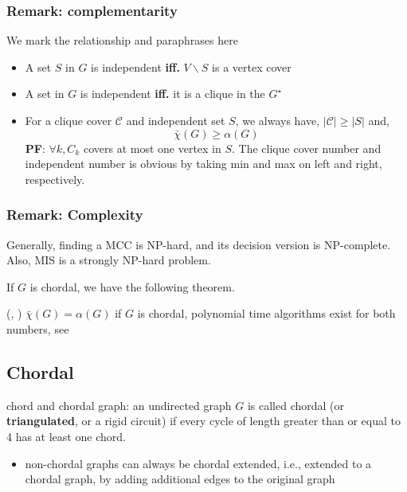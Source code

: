 \subsubsection*{Remark: complementarity}
We mark the relationship and paraphrases here
\begin{itemize}
      \item A set \(S\) in \(G\) is independent \textbf{iff.} \(V\backslash S\) is a vertex cover
      \item A set in \(G\) is independent \textbf{iff.} it is a clique in the \(G^\star\)
      \item For a clique cover \(\mathscr C\) and independent set \(S\), we always have, \(|\mathscr C| \ge |S|\) and,
            \[\bar \chi (G) \ge \alpha(G)\]
            \textbf{PF}: \(\forall k, C_k \) covers at most one vertex in \(S\). The clique cover number and independent number is obvious by taking min and max on left and right, respectively.
\end{itemize}

\subsubsection*{Remark: Complexity}

Generally, finding a MCC is NP-hard, and its decision version is NP-complete. Also, MIS is a strongly NP-hard problem.

If \(G\) is chordal, we have the following theorem.

\begin{theorem}
      (\cite{gavril_algorithms_1972}, \cite{vandenberghe_chordal_2015})
      \(\bar \chi (G) = \alpha(G)\) if \(G\) is chordal,
      polynomial time algorithms exist for both numbers, see \cite{gavril_algorithms_1972}
\end{theorem}


\subsection{Chordal}

chord and chordal graph: an undirected graph \(G\) is called chordal
(or \textbf{triangulated}, or a rigid circuit) if every cycle of
length greater than or equal to 4 has at least one chord.

\begin{itemize}
      \tightlist
      \item non-chordal graphs can always be chordal extended, i.e., extended to  a chordal graph, by adding additional edges to the original graph
\end{itemize}

